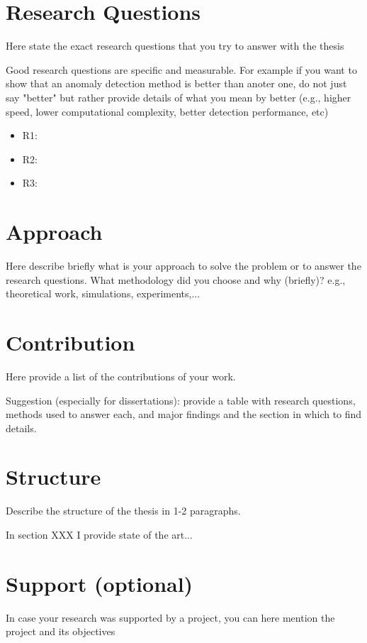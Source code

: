 

\section{Research Questions} \label{sect.research_questions}

Here state the exact research questions that you try to answer with the thesis

Good research questions are specific and measurable. For example if you want to show that an anomaly detection method is better than anoter one, do not just say "better" but rather provide details of what you mean by better (e.g., higher speed, lower computational complexity, better detection performance, etc)

\begin{itemize}
	\item R1: 
	\item R2:
	\item R3:
\end{itemize}



\section{Approach} \label{sect.approach}

Here describe briefly what is your approach to solve the problem or to answer the research questions. What methodology did you choose and why (briefly)? e.g., theoretical work, simulations, experiments,...

\section{Contribution} \label{sect.contribution}

Here provide a list of the contributions of your work.

Suggestion (especially for dissertations): provide a table with research questions, methods used to answer each, and major findings and the section in which to find details.

\section{Structure} \label{sect.structure}
Describe the structure of the thesis in 1-2 paragraphs.

In section XXX I provide state of the art...


\section{Support (optional)   } \label{sect.support}
In case your research was supported by a project, you can here mention the project and its objectives

\newpage